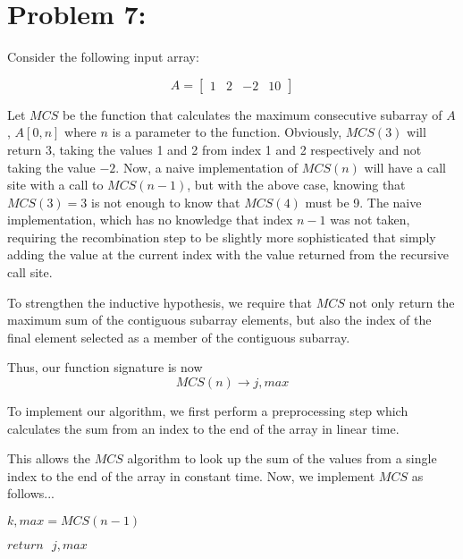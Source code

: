 \documentclass[12pt]{article}
\begin{document}
\section*{Problem 7: }

Consider the following input array:

\[
A =
  \begin{bmatrix}
    1 & 2 & -2 & 10
  \end{bmatrix}
\]

Let $MCS$ be the function that calculates the maximum consecutive subarray of $A$, $A[0, n]$ where $n$ is a parameter to the function. Obviously, $MCS(3)$ will return $3$, taking the values 1 and 2 from index 1 and 2 respectively and not taking the value $-2$. Now, a naive implementation of $MCS(n)$ will have a call site with a call to $MCS(n-1)$, but with the above case, knowing that $MCS(3) = 3$ is not enough to know that $MCS(4)$ must be 9. The naive implementation, which has no knowledge that index $n-1$ was not taken, requiring the recombination step to be slightly more sophisticated that simply adding the value at the current index with the value returned from the recursive call site.

To strengthen the inductive hypothesis, we require that $MCS$ not only return the maximum sum of the contiguous subarray elements, but also the index of the final element selected as a member of the contiguous subarray.

Thus, our function signature is now
\[
MCS(n) \to j, max
\]

To implement our algorithm, we first perform a preprocessing step which calculates the sum from an index to the end of the array in linear time. \\

\begin{algorithm}[H]
\BlankLine

\end{algorithm}

This allows the $MCS$ algorithm to look up the sum of the values from a single index to the end of the array in constant time.
Now, we implement $MCS$ as follows... \\

\begin{algorithm}[H]
\BlankLine
	$k, max = MCS(n-1)$
	
	$return \text{ } j, max$
\end{algorithm}
\end{document}
